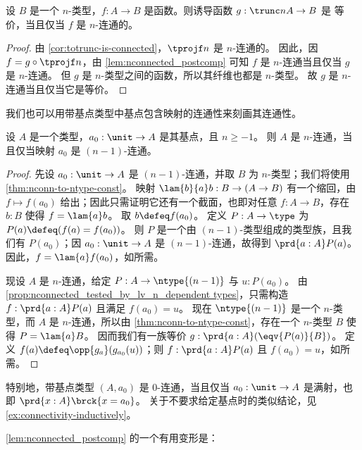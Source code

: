 \begin{lem}\label{lem:nconnected_to_leveln_to_equiv}
设 $B$ 是一个 $n$-类型，$f:A\to B$ 是函数。则诱导函数 $g:\trunc n A\to B$ 是
等价，当且仅当 $f$ 是 $n$-连通的。
\end{lem}

\begin{proof}
由 \cref{cor:totrunc-is-connected}，$\tprojf n$ 是 $n$-连通的。
因此，因 $f = g\circ \tprojf n$，由
\cref{lem:nconnected_postcomp} 可知 $f$ 是 $n$-连通当且仅当 $g$ 是 $n$-连通。
但 $g$ 是 $n$-类型之间的函数，所以其纤维也都是 $n$-类型。
故 $g$ 是 $n$-连通当且仅当它是等价。
\end{proof}

我们也可以用带基点类型中基点包含映射的连通性来刻画其连通性。

\begin{lem}\label{thm:connected-pointed}
  设 $A$ 是一个类型，$a_0:\unit\to A$ 是其基点，且 $n\ge -1$。
  则 $A$ 是 $n$-连通，当且仅当映射 $a_0$ 是 $(n-1)$-连通。
\end{lem}
\begin{proof}
  先设 $a_0:\unit\to A$ 是 $(n-1)$-连通，并取 $B$ 为 $n$-类型；我们将使用 \cref{thm:nconn-to-ntype-const}。
  映射 $\lam{b}{a} b: B \to (A\to B)$ 有一个缩回，由 $f\mapsto f(a_0)$ 给出；因此只需证明它还有一个截面，也即对任意 $f:A\to B$，存在 $b:B$ 使得 $f = \lam{a}b$。
  取 $b\defeq f(a_0)$。
  定义 $P:A\to\type$ 为 $P(a) \defeq (f(a)=f(a_0))$。
  则 $P$ 是一个由 $(n-1)$-类型组成的类型族，且我们有 $P(a_0)$；因 $a_0:\unit\to A$ 是 $(n-1)$-连通，故得到 $\prd{a:A} P(a)$。
  因此，$f = \lam{a} f(a_0)$，如所需。

  现设 $A$ 是 $n$-连通，给定 $P:A\to\ntype{(n-1)}$ 与 $u:P(a_0)$。
  由 \cref{prop:nconnected_tested_by_lv_n_dependent types}，只需构造 $f:\prd{a:A} P(a)$ 且满足 $f(a_0)=u$。
  现在 $\ntype{(n-1)}$ 是一个 $n$-类型，而 $A$ 是 $n$-连通，所以由 \cref{thm:nconn-to-ntype-const}，存在一个 $n$-类型 $B$ 使得 $P = \lam{a} B$。
  因而我们有一族等价 $g:\prd{a:A} (\eqv{P(a)}{B})$。
  定义 $f(a) \defeq \opp{g_a}(g_{a_0}(u))$；则 $f:\prd{a:A} P(a)$ 且 $f(a_0) = u$，如所需。
\end{proof}

特别地，带基点类型 $(A,a_0)$ 是 0-连通，当且仅当 $a_0:\unit\to A$ 是满射，也即 $\prd{x:A} \brck{x=a_0}$。
关于不要求给定基点时的类似结论，见 \cref{ex:connectivity-inductively}。

\cref{lem:nconnected_postcomp} 的一个有用变形是：

